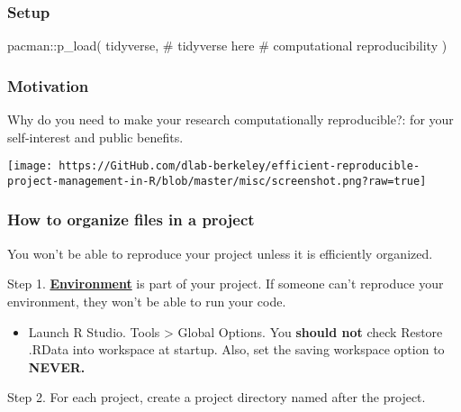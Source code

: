 \documentclass[
  letterpaper,
  DIV=11,
  numbers=noendperiod]{scrreprt}
\newenvironment{Shaded}{\begin{snugshade}}{\end{snugshade}}
\newcommand{\CommentTok}[1]{\textcolor[rgb]{0.37,0.37,0.37}{#1}}
\newcommand{\FunctionTok}[1]{\textcolor[rgb]{0.28,0.35,0.67}{#1}}
\newcommand{\NormalTok}[1]{\textcolor[rgb]{0.00,0.23,0.31}{#1}}
\newcommand{\SpecialCharTok}[1]{\textcolor[rgb]{0.37,0.37,0.37}{#1}}
\providecommand{\tightlist}{%
  \setlength{\itemsep}{0pt}\setlength{\parskip}{0pt}}\usepackage{longtable,booktabs,array}
\begin{document}
\hypertarget{setup-1}{%
\subsubsection*{Setup}\label{setup-1}}

\begin{Shaded}
\begin{Highlighting}[]
\NormalTok{pacman}\SpecialCharTok{::}\FunctionTok{p\_load}\NormalTok{(}
\NormalTok{  tidyverse, }\CommentTok{\# tidyverse}
\NormalTok{  here }\CommentTok{\# computational reproducibility}
\NormalTok{)}
\end{Highlighting}
\end{Shaded}

\hypertarget{motivation}{%
\subsubsection*{Motivation}\label{motivation}}

Why do you need to make your research computationally reproducible?: for
your self-interest and public benefits.

\texttt{[image: https://GitHub.com/dlab-berkeley/efficient-reproducible-project-management-in-R/blob/master/misc/screenshot.png?raw=true]}

\hypertarget{how-to-organize-files-in-a-project}{%
\subsubsection*{How to organize files in a
project}\label{how-to-organize-files-in-a-project}}

You won't be able to reproduce your project unless it is efficiently
organized.

Step 1. \href{https://environments.rstudio.com/}{\textbf{Environment}}
is part of your project. If someone can't reproduce your environment,
they won't be able to run your code.

\begin{itemize}
\tightlist
\item
  Launch R Studio. Tools \textgreater{} Global Options. You
  \textbf{should not} check Restore .RData into workspace at startup.
  Also, set the saving workspace option to \textbf{NEVER.}
\end{itemize}

Step 2. For each project, create a project directory named after the
project.
\end{document}
